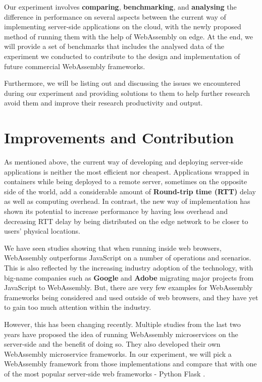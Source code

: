 Our experiment involves \textbf{comparing}, \textbf{benchmarking}, and \textbf{analysing} the difference in performance on several aspects between the current way of implementing server-side applications on the cloud, with the newly proposed method of running them with the help of WebAssembly on edge. At the end, we will provide a set of benchmarks that includes the analysed data of the experiment we conducted to contribute to the design and implementation of future commercial WebAssembly frameworks.

Furthermore, we will be listing out and discussing the issues we encountered during our experiment and providing solutions to them to help further research avoid them and improve their research productivity and output.

\bigskip
\section{Improvements and Contribution}

As mentioned above, the current way of developing and deploying server-side applications is neither the most efficient nor cheapest. Applications wrapped in containers while being deployed to a remote server, sometimes on the opposite side of the world, add a considerable amount of \textbf{Round-trip time (RTT)} delay as well as computing overhead. In contrast, the new way of implementation has shown its potential to increase performance by having less overhead and decreasing RTT delay by being distributed on the edge network to be closer to users' physical locations.

We have seen studies showing that when running inside web browsers, WebAssembly outperforms JavaScript on a number of operations and scenarios. This is also reflected by the increasing industry adoption of the technology, with big-name companies such as \textbf{Google} and \textbf{Adobe} migrating major projects from JavaScript to WebAssembly. But, there are very few examples for WebAssembly frameworks being considered and used outside of web browsers, and they have yet to gain too much attention within the industry.

However, this has been changing recently. Multiple studies from the last two years have proposed the idea of running WebAssembly microservices on the server-side and the benefit of doing so. They also developed their own WebAssembly microservice frameworks. In our experiment, we will pick a WebAssembly framework from those implementations and compare that with one of the most popular server-side web frameworks - Python Flask \cite{eva4}.

